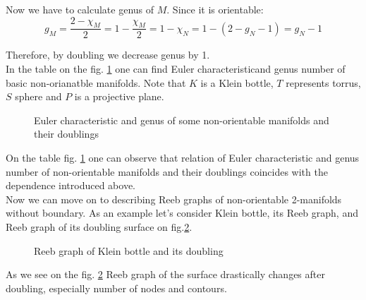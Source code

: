 \documentclass[]{article}
\begin{document}
Now we have to calculate genus of $M$. Since it is orientable:
\begin{equation}
g_M=\frac{2-\chi_M}{2}=1-\frac{\chi_M}{2}=1-\chi_N=1-(2-g_N-1)=g_N-1
\end{equation}

Therefore, by doubling we decrease genus by 1. \\

In the table on the fig. \ref{fig:Table} one can find Euler characteristicand genus number of basic non-orianatble manifolds. Note that $K$ is a Klein bottle, $T$ represents torrus,$S$ sphere and $P$ is a projective plane. 
\begin{figure}[h!]
\caption{Euler characteristic and genus of some non-orientable manifolds and their doublings}
\label{fig:Table}
\end{figure}
On the table fig. \ref{fig:Table} one can observe that relation of Euler characteristic and genus number of non-orientable manifolds and their doublings coincides with the dependence introduced above. \\

Now we can move on to describing Reeb graphs of non-orientable 2-manifolds without boundary. As an example let's consider Klein bottle, its Reeb graph, and Reeb graph of its doubling surface on fig.\ref{fig:Klein}. \\
\begin{figure}[h!]
\caption{Reeb graph of Klein bottle and its doubling}
\label{fig:Klein}
\end{figure}
As we see on the fig. \ref{fig:Klein} Reeb graph of the surface drastically changes after doubling, especially number of nodes and contours.\\
\end{document}
